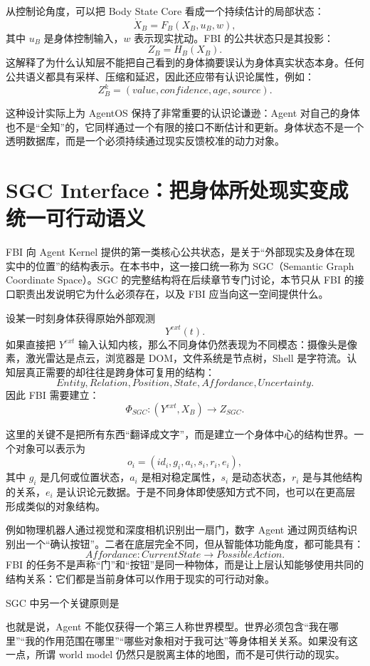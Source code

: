 从控制论角度，可以把 Body State Core 看成一个持续估计的局部状态：
\[
\dot X_B
=
F_B(X_B,u_B,w),
\]
其中 \(u_B\) 是身体控制输入，\(w\) 表示现实扰动。FBI 的公共状态只是其投影：
\[
Z_B
=
H_B(X_B).
\]
这解释了为什么认知层不能把自己看到的身体摘要误认为身体真实状态本身。任何公共语义都具有采样、压缩和延迟，因此还应带有认识论属性，例如：
\[
Z_B^k
=
(
value,
confidence,
age,
source
).
\]

这种设计实际上为 AgentOS 保持了非常重要的认识论谦逊：Agent 对自己的身体也不是“全知”的，它同样通过一个有限的接口不断估计和更新。身体状态不是一个透明数据库，而是一个必须持续通过现实反馈校准的动力对象。


\section{SGC Interface：把身体所处现实变成统一可行动语义}

FBI 向 Agent Kernel 提供的第一类核心公共状态，是关于“外部现实及身体在现实中的位置”的结构表示。在本书中，这一接口统一称为 SGC（Semantic Graph Coordinate Space）。SGC 的完整结构将在后续章节专门讨论，本节只从 FBI 的接口职责出发说明它为什么必须存在，以及 FBI 应当向这一空间提供什么。

设某一时刻身体获得原始外部观测
\[
Y^{ext}(t).
\]
如果直接把 \(Y^{ext}\) 输入认知内核，那么不同身体仍然表现为不同模态：摄像头是像素，激光雷达是点云，浏览器是 DOM，文件系统是节点树，Shell 是字符流。认知层真正需要的却往往是跨身体可复用的结构：
\[
Entity,
Relation,
Position,
State,
Affordance,
Uncertainty.
\]
因此 FBI 需要建立：
\[
\Phi_{SGC}:
(Y^{ext},X_B)
\rightarrow
Z_{SGC}.
\]

这里的关键不是把所有东西“翻译成文字”，而是建立一个身体中心的结构世界。一个对象可以表示为
\[
o_i
=
(
id_i,
g_i,
a_i,
s_i,
r_i,
e_i
),
\]
其中 \(g_i\) 是几何或位置状态，\(a_i\) 是相对稳定属性，\(s_i\) 是动态状态，\(r_i\) 是与其他结构的关系，\(e_i\) 是认识论元数据。于是不同身体即使感知方式不同，也可以在更高层形成类似的对象结构。

例如物理机器人通过视觉和深度相机识别出一扇门，数字 Agent 通过网页结构识别出一个“确认按钮”。二者在底层完全不同，但从智能体功能角度，都可能具有：
\[
Affordance:
CurrentState
\rightarrow
PossibleAction.
\]
FBI 的任务不是声称“门”和“按钮”是同一种物体，而是让上层认知能够使用共同的结构关系：它们都是当前身体可以作用于现实的可行动对象。

SGC 中另一个关键原则是
\begin{statementbox}
\centering
{}
\end{statementbox}
也就是说，Agent 不能仅获得一个第三人称世界模型。世界必须包含“我在哪里”“我的作用范围在哪里”“哪些对象相对于我可达”等身体相关关系。如果没有这一点，所谓 world model 仍然只是脱离主体的地图，而不是可供行动的现实。

